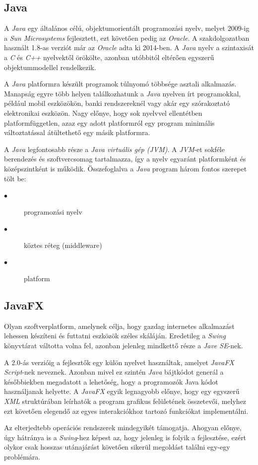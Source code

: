 \documentclass{elteikthesis}
\begin{document}
\subsection{Java}
A \emph{Java} egy általános célú, objektumorientált programozási nyelv, melyet 2009-ig a \emph{Sun Microsystems} fejlesztett, ezt követően pedig az \emph{Oracle}. A szakdolgozatban használt 1.8-as verziót már az \emph{Oracle} adta ki 2014-ben. A \emph{Java} nyelv a szintaxisát a \emph{C} és \emph{C++} nyelvektől örökölte, azonban utóbbitól eltérően egyszerű objektummodellel rendelkezik. \par
 A \emph{Java} platformra készült programok túlnyomó többsége asztali alkalmazás. Manapság egyre több helyen találkozhatunk a \emph{Java} nyelven írt programokkal, például mobil eszközökön, banki rendszereknél vagy akár egy szórakoztató elektronikai eszközön. Nagy előnye, hogy sok nyelvvel ellentétben platformfüggetlen, azaz egy adott platformról egy program minimális változtatással átültethető egy másik platformra. \par
 A \emph{Java} legfontosabb része a \emph{Java virtuális gép (JVM)}. A \emph{JVM}-et sokféle berendezés és szoftvercsomag tartalmazza, így a nyelv egyaránt platformként és középszintként is működik.
Összefoglalva a \emph{Java} program három fontos szerepet tölt be:
\begin{description}
\item[$\bullet$] programozási nyelv
\item[$\bullet$] köztes réteg (middleware)
\item[$\bullet$] platform
\end{description}

\subsection{JavaFX}
Olyan szoftverplatform, amelynek célja, hogy gazdag internetes alkalmazást lehessen készíteni és futtatni eszközök széles skáláján. Eredetileg a \emph{Swing} könyvtárat váltotta volna fel, azonban jelenleg mindkettő része a \emph{Jave SE}-nek. \par
 A 2.0-ás verzióig a fejlesztők egy külön nyelvet használtak, amelyet \emph{JavaFX Script}-nek neveznek. Azonban mivel ez szintén \emph{Java} bájtkódot generál a későbbiekben megadatott a lehetőség, hogy a programozók Java kódot használjanak helyette. A \emph{JavaFX} egyik legnagyobb előnye, hogy egy egyszerű \emph{XML} struktúrában leírhatók a program grafikus felületének összetevői, melyhez ezt követően elegendő az egyes interakciókhoz tartozó funkciókat implementálni.\par Az elterjedtebb operációs rendszerek mindegyikét támogatja. Ahogyan előnye, úgy hátránya is a \emph{Swing}-hez képest az, hogy jelenleg is folyik a fejlesztése, ezért olykor csak hosszas utánajárást követően sikerül megoldást találni egy-egy problémára.
 
\end{document}

